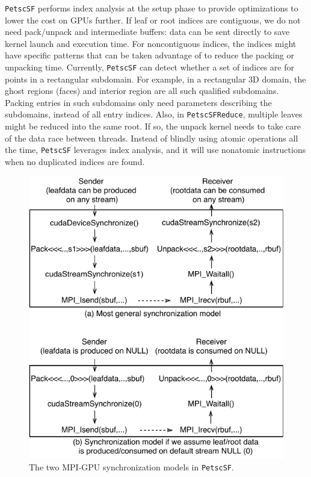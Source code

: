 \documentclass[5p,times]{elsarticle}
\begin{document}
{\tt PetscSF} performs index analysis at the setup phase to provide optimizations to lower the
cost on GPUs further. If  leaf or root indices
are contiguous, we do not need pack/unpack and intermediate
buffers: data can be sent directly to save kernel launch and
execution time. For noncontiguous indices, the indices might have specific
patterns that can be taken advantage of to reduce the packing or unpacking time. Currently, {\tt PetscSF} can detect whether a set of indices are for points in a
rectangular subdomain. For example, in a rectangular 3D domain, the ghost
regions (faces) and interior region are all such qualified subdomains. Packing entries in such subdomains
only need parameters describing the subdomains, instead of all entry indices.
Also,  in \texttt{PetscSFReduce}, multiple leaves might be reduced into the same root. If so, the unpack kernel needs to take care
of the data race between threads. Instead of blindly using atomic operations all the time, {\tt PetscSF} leverages index analysis, and it will use nonatomic
instructions when no duplicated indices are found.

\begin{figure}[tb]
\begin{center}
\includegraphics[width=.9\linewidth]{figures/SFSyncModels.pdf}
\caption{The two MPI-GPU synchronization models in {\tt PetscSF}.}
\label{fig:sf_sync_models}
\end{center}
\end{figure}
\end{document}
